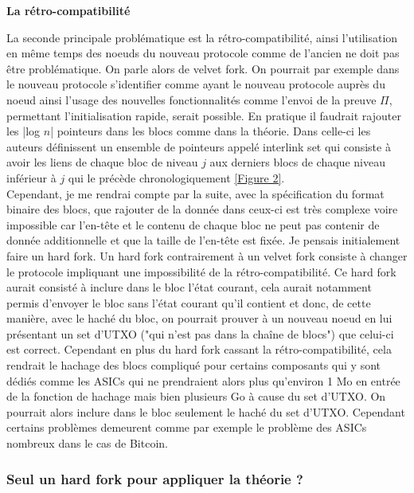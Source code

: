 \documentclass[12pt,a4paper]{article}
\newcommand{\annexe}[2]{\hyperlink{#1}{[Figure #2]}}
\begin{document}
	\textbf{La rétro-compatibilité\\}
	
	La seconde principale problématique est la rétro-compatibilité, ainsi l'utilisation en même temps des noeuds du nouveau protocole comme de l'ancien ne doit pas être problématique. On parle alors de velvet fork. On pourrait par exemple dans le nouveau protocole s'identifier comme ayant le nouveau protocole auprès du noeud ainsi l'usage des nouvelles fonctionnalités comme l'envoi de la preuve $\Pi$, permettant l'initialisation rapide, serait possible. En pratique il faudrait rajouter les |log $n$| pointeurs dans les blocs comme dans la théorie. Dans celle-ci les auteurs définissent un ensemble de pointeurs appelé interlink set qui consiste à avoir les liens de chaque bloc de niveau $j$ aux derniers blocs de chaque niveau inférieur à $j$ qui le précède chronologiquement \annexe{22}{2}.\\ %
	Cependant, je me rendrai compte par la suite, avec la spécification du format binaire des blocs, que rajouter de la donnée dans ceux-ci est très complexe voire impossible car l'en-tête et le contenu de chaque bloc ne peut pas contenir de donnée additionnelle et que la taille de l'en-tête est fixée. Je pensais initialement faire un hard fork. Un hard fork contrairement à un velvet fork consiste à changer le protocole impliquant une impossibilité de la rétro-compatibilité. Ce hard fork aurait consisté à inclure dans le bloc l'état courant, cela aurait notamment permis d'envoyer le bloc sans l'état courant qu'il contient et donc, de cette manière, avec le haché du bloc, on pourrait prouver à un nouveau noeud en lui présentant un set d'UTXO ("qui n'est pas dans la chaîne de blocs") que celui-ci est correct. Cependant en plus du hard fork cassant la rétro-compatibilité, cela rendrait le hachage des blocs compliqué pour certains composants qui y sont dédiés comme les ASICs qui ne prendraient alors plus qu'environ 1 Mo en entrée de la fonction de hachage mais bien plusieurs Go à cause du set d'UTXO. %
	On pourrait alors inclure dans le bloc seulement le haché du set d'UTXO. Cependant certains problèmes demeurent comme par exemple le problème des ASICs nombreux dans le cas de Bitcoin.
	
	\subsubsection{Seul un hard fork pour appliquer la théorie ?}
	
\end{document}
